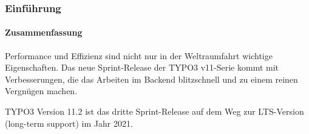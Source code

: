%

\begin{frame}[fragile]
	\frametitle{Einführung}
	\framesubtitle{Zusammenfassung}

	\small
		Performance und Effizienz sind nicht nur in der Weltraumfahrt wichtige Eigenschaften.
		Das neue Sprint-Release der TYPO3 v11-Serie kommt mit Verbesserungen,
		die das Arbeiten im Backend blitzschnell und zu einem reinen Vergnügen machen.

		\vspace{0.2cm}

		TYPO3 Version 11.2 ist das dritte Sprint-Release auf dem Weg zur LTS-Version
		(long-term support) im Jahr 2021.

	\normalsize

\end{frame}

